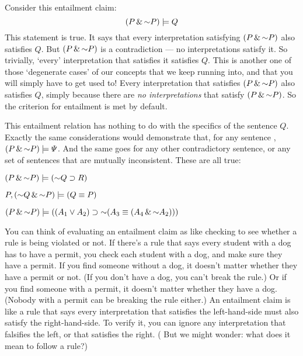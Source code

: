 {{%

Consider this entailment claim: $$(P \eand \enot P) \models Q$$This statement is true. It says that every interpretation satisfying $(P \eand \enot P)$ also satisfies $Q$. But $(P \eand \enot P)$ is a contradiction --- no interpretations satisfy it. So trivially, `every' interpretation that satisfies it satisfies $Q$. {\color{black} This is another one of those `degenerate cases' of our concepts that we keep running into, and that you will simply have to get used to! Every interpretation that satisfies $(P \eand \enot P)$ also satisfies $Q$, simply because there are \textit{no interpretations} that satisfy $(P \eand \enot P)$. So the criterion for entailment is met by default.}

This entailment relation has nothing to do with the specifics of the sentence $Q$. Exactly the same considerations would demonstrate that, for any sentence \metaB{}, $(P \eand \enot P) \models \metaB{}$. And the same goes for any other contradictory sentence, or any set of sentences that are mutually inconsistent. These are all true:

\begin{earg}
\item[] $(P \eand \enot P) \models (\enot Q \eif R)$
\item[] $P, (\enot Q \eand \enot P) \models (Q \eiff P)$
\item[] $(P \eand\enot P) \models ((A_1 \eor A_2) \eif \enot (A_3 \eiff (A_4 \eand \enot A_2)))$
\end{earg}

You can think of evaluating an entailment claim as like checking to see whether a rule is being violated or not. If there's a rule that says every student with a dog has to have a permit, you check each student with a dog, and make sure they have a permit. If you find someone without a dog, it doesn't matter whether they have a permit or not. (If you don't have a dog, you can't break the rule.) Or if you find someone with a permit, it doesn't matter whether they have a dog. (Nobody with a permit can be breaking the rule either.) An entailment claim is like a rule that says every interpretation that satisfies the left-hand-side must also satisfy the right-hand-side. To verify it, you can ignore any interpretation that falsifies the left, or that satisfies the right. ({\color{black} But we might wonder: what does it mean to follow a rule?)}

}}
